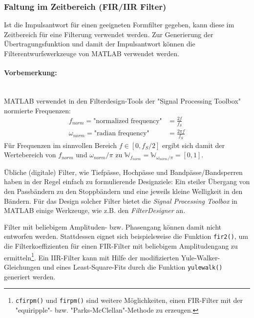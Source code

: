 \subsubsection{Faltung im Zeitbereich (FIR/IIR Filter)}
Ist die Impulsantwort für einen geeigneten Formfilter gegeben, kann diese im Zeitbereich für eine Filterung verwendet werden. Zur Generierung der Übertragungsfunktion und damit der Impulsantwort können die Filterentwurfswerkzeuge von MATLAB verwendet werden.

\paragraph{Vorbemerkung:}\mbox{}\\
MATLAB verwendet in den Filterdesign-Tools der "Signal Processing Toolbox" normierte Frequenzen:
\begin{subequations}
	\begin{align}
	f_{norm} = \text{"normalized frequency"} &= \frac{2f}{f_S} \\
	\omega_{norm} = \text{"radian frequency"} &= \frac{2\pi f}{f_S}
	\end{align}
\end{subequations}
Für Frequenzen im sinnvollen Bereich $f\in [0,f_S/2]$ ergibt sich damit der Wertebereich von
$f_{norm}$ und $\omega_{norm}/\pi$ zu $\mathbb{W}_{f_{norm}}=\mathbb{W}_{\omega_{norm}/\pi}=[0,1]$.

\vspace{10ex}


Übliche (digitale) Filter, wie Tiefpässe, Hochpässe und Bandpässe/Bandsperren haben in der Regel einfach zu formulierende Designziele: Ein steiler Übergang von den Passbändern zu den Stoppbändern und eine jeweils kleine Welligkeit in den Bändern.
Für das Design solcher Filter bietet die \textit{Signal Processing Toolbox} in MATLAB einige Werkzeuge, wie z.B. den \textit{FilterDesigner} an.

Filter mit beliebigem Amplituden- bzw. Phasengang können damit nicht entworfen werden. Stattdessen eignet sich beispielsweise die Funktion \texttt{fir2()}, um die Filterkoeffizienten für einen FIR-Filter mit beliebigem Amplitudengang zu ermitteln\footnote{\texttt{cfirpm()} und \texttt{firpm()} sind weitere Möglichkeiten, einen FIR-Filter mit der "equiripple"- bzw. "Parks-McClellan"-Methode zu erzeugen.}. Ein IIR-Filter kann mit Hilfe der modifizierten Yule-Walker-Gleichungen und eines Least-Square-Fits durch die Funktion \texttt{yulewalk()} generiert werden.

